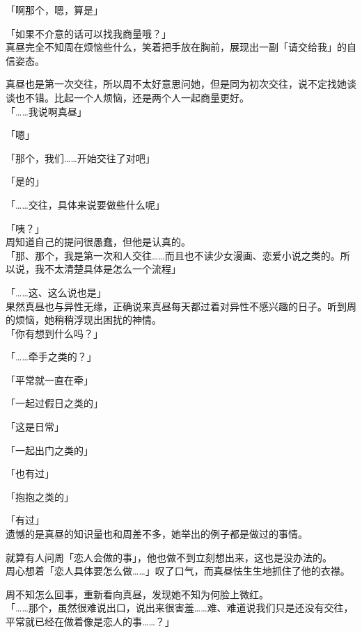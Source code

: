 「啊那个，嗯，算是」

「如果不介意的话可以找我商量哦？」\\

真昼完全不知周在烦恼些什么，笑着把手放在胸前，展现出一副「请交给我」的自信姿态。

真昼也是第一次交往，所以周不太好意思问她，但是同为初次交往，说不定找她谈谈也不错。比起一个人烦恼，还是两个人一起商量更好。\\

「……我说啊真昼」

「嗯」

「那个，我们……开始交往了对吧」

「是的」

「……交往，具体来说要做些什么呢」

「咦？」\\

周知道自己的提问很愚蠢，但他是认真的。\\

「那、那个，我是第一次和人交往……而且也不读少女漫画、恋爱小说之类的。所以说，我不太清楚具体是怎么一个流程」

「……这、这么说也是」\\

果然真昼也与异性无缘，正确说来真昼每天都过着对异性不感兴趣的日子。听到周的烦恼，她稍稍浮现出困扰的神情。\\

「你有想到什么吗？」

「……牵手之类的？」

「平常就一直在牵」

「一起过假日之类的」

「这是日常」

「一起出门之类的」

「也有过」

「抱抱之类的」

「有过」\\

遗憾的是真昼的知识量也和周差不多，她举出的例子都是做过的事情。

就算有人问周「恋人会做的事」，他也做不到立刻想出来，这也是没办法的。\\

周心想着「恋人具体要怎么做……」叹了口气，而真昼怯生生地抓住了他的衣襟。

周不知怎么回事，重新看向真昼，发现她不知为何脸上微红。\\

「……那个，虽然很难说出口，说出来很害羞……难、难道说我们只是还没有交往，平常就已经在做着像是恋人的事……？」\\

